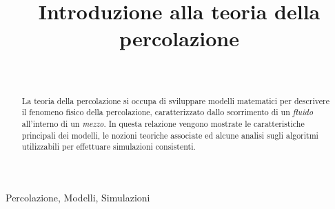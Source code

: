 \documentclass[journal]{IEEEtran}
\theoremstyle{definition}
\begin{document}
\title{Introduzione alla teoria della percolazione}

\author{
\\
}

\maketitle

\begin{abstract}
	La teoria della percolazione si occupa di sviluppare modelli matematici per descrivere il 
	fenomeno fisico della percolazione, caratterizzato dallo scorrimento di un \textit{fluido} 
	all'interno di un \textit{mezzo}. In questa relazione vengono mostrate le caratteristiche
	principali dei modelli, le nozioni teoriche associate ed alcune analisi sugli algoritmi 
	utilizzabili per effettuare simulazioni consistenti.   
\end{abstract}

\begin{IEEEkeywords}
Percolazione, Modelli, Simulazioni
\end{IEEEkeywords}





% 



\end{document}
